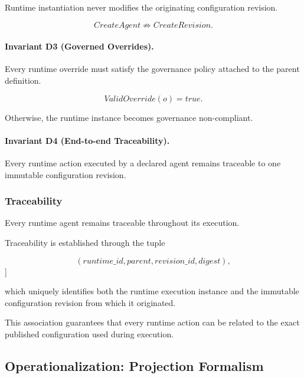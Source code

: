 \documentclass[10pt]{article}
\begin{document}
Runtime instantiation never modifies the originating configuration revision.

\begin{equation}
CreateAgent
\not\Rightarrow
CreateRevision.
\label{eq:dynamic_agent5}
\end{equation}

\paragraph{Invariant D3 (Governed Overrides).}

Every runtime override must satisfy the governance policy attached to the
parent definition.

\[
ValidOverride(o)=true.
\]

Otherwise, the runtime instance becomes governance non-compliant.

\paragraph{Invariant D4 (End-to-end Traceability).}

Every runtime action executed by a declared agent remains traceable to one
immutable configuration revision.

\subsubsection{Traceability}

Every runtime agent remains traceable throughout its execution.

Traceability is established through the tuple

\begin{equation}
(
runtime\_id,
parent,
revision\_id,
digest
),
\label{eq:dynamic_agent7}
\end{equation}]

which uniquely identifies both the runtime execution instance and the immutable
configuration revision from which it originated.

This association guarantees that every runtime action can be related to the
exact published configuration used during execution.

\subsection{Operationalization: Projection Formalism}
\label{appendix:projection_formalism}
\end{document}
